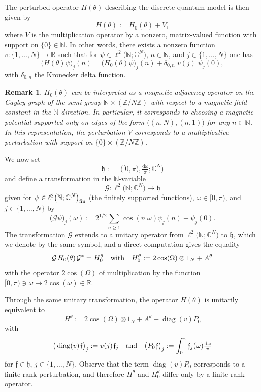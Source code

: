 \documentclass[11pt]{article}
\def\C{\mathbb C}
\def\d{\mathrm d}
\def\f{\mathfrak f}
\def\G{\mathcal G}
\def\h{\mathfrak h}
\def\N{\mathbb N}
\def\R{\mathbb R}
\def\Z{\mathbb Z}
\def\diag{\mathop{\mathrm{diag}}\nolimits}
\def\ltwo{\mathop{\mathrm{L}^2}\nolimits}
\newtheorem{Remark}[Theorem]{Remark}
\begin{document}
The perturbed operator $H(\theta)$ describing the discrete quantum model is then given by
\begin{equation*}
H(\theta):=H_0(\theta)+V,
\end{equation*}
where $V$ is the multiplication operator by a nonzero, matrix-valued function
with support on $\{0\}\in \N$. In other words, there exists a nonzero function
$v:\{1,\dots,N\}\to\R$ such that for $\psi\in \ell^2\big(\N;\C^N\big)$, $n\in\N$, and $j\in \{1, \dots, N\}$
one has
$$
\big(H(\theta)\psi\big)_j(n)=\big(H_0(\theta)\psi\big)_j(n)+\delta_{0,n}\;\!v(j)\;\!\psi_j(0),
$$
with $\delta_{0,n}$ the Kronecker delta function.

\begin{Remark}\label{rem:magnetic}
$H_0(\theta)$ can be interpreted as a magnetic adjacency operator on the Cayley graph of the semi-group $\N\times (\Z/N \Z)$ with respect to a magnetic field constant in the $\N$ direction. In particular, it corresponds to choosing a magnetic potential supported only on edges of the form $\big((n,N),(n,1)\big)$ for any $n\in \N$. In this representation, the perturbation $V$ corresponds
to a multiplicative perturbation with support on $\{0\}\times (\Z/N \Z)$.
\end{Remark}

We now set
$$
\h:=\ltwo\big([0,\pi),\tfrac{\d\omega}\pi;\C^N\big)
$$
and define a transformation in the $\N$-variable
$$
\G: \ell^2\big(\N;\C^N\big) \to\h
$$
given for $\psi \in \ell^2\big(\N;\C^N\big)_{\rm fin}$ (the finitely supported functions), $\omega\in [0,\pi)$, and $j\in \{1,\dots,N\}$ by
$$
\big(\G \psi\big)_j(\omega)
:=2^{1/2}\sum_{n\ge1}\cos(n\;\!\omega)\psi_j(n)+\psi_j(0).
$$
The transformation $\G$ extends to a unitary operator from
$\ell^2\big(\N;\C^N\big)$ to $\h$, which we denote by the same
symbol, and a direct computation gives the equality
$$
\G\;\!H_0(\theta)\;\!\G^*= H^\theta_0
\quad\hbox{with}\quad
H^\theta_0:=2\cos(\Omega)\otimes 1_N+A^\theta
$$
with the operator $2\cos(\Omega)$ of multiplication by the function
$[0,\pi)\ni\omega\mapsto2\cos(\omega)\in\R$.

Through the same unitary transformation, the operator $H(\theta)$ 
is unitarily equivalent to 
\begin{equation*}
H^\theta:=2\cos(\Omega)\otimes 1_N+A^\theta+\diag(v)P_0
\end{equation*}
with
\begin{equation*}
\big(\diag(v)\;\!\f\big)_j
:=v(j)\;\!\f_j
\quad\hbox{and}\quad
\big(P_0\;\!\f\big)_j
:=\int_0^\pi \f_j(\omega)\tfrac{\d\omega}\pi
\end{equation*}
for $\f\in\h$, $j\in\{1,\dots,N\}$.
Observe that the term $\diag(v)P_0$ corresponds to a finite rank
perturbation, and therefore $H^\theta$ and $H_0^\theta$
differ only by a finite rank operator.
\end{document}
